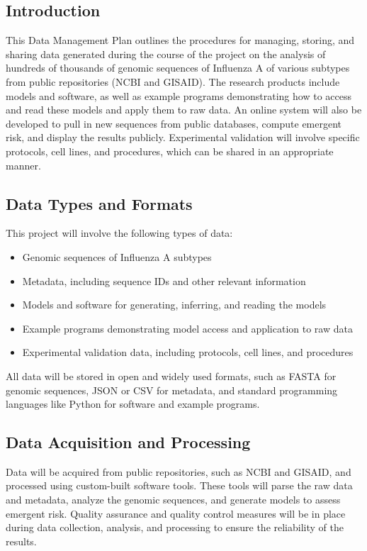 \documentclass[onecolumn, compsoc,12pt]{IEEEtran}
\begin{document}
\subsection{Introduction} 

This Data Management Plan outlines the procedures for managing, storing, and sharing data generated during the course of the project on the analysis of hundreds of thousands of genomic sequences of Influenza A of various subtypes from public repositories (NCBI and GISAID). The research products include models and software, as well as example programs demonstrating how to access and read these models and apply them to raw data. An online system will also be developed to pull in new sequences from public databases, compute emergent risk, and display the results publicly. Experimental validation will involve specific protocols, cell lines, and procedures, which can be shared in an appropriate manner.

\subsection{Data Types and Formats}

This project will involve the following types of data:

\begin{itemize}
  \item Genomic sequences of Influenza A subtypes
  \item Metadata, including sequence IDs and other relevant information
  \item Models and software for generating, inferring, and reading the models
  \item Example programs demonstrating model access and application to raw data
  \item Experimental validation data, including protocols, cell lines, and procedures
\end{itemize}

All data will be stored in open and widely used formats, such as FASTA for genomic sequences, JSON or CSV for metadata, and standard programming languages like Python for software and example programs.

\subsection{Data Acquisition and Processing}

Data will be acquired from public repositories, such as NCBI and GISAID, and processed using custom-built software tools. These tools will parse the raw data and metadata, analyze the genomic sequences, and generate models to assess emergent risk. Quality assurance and quality control measures will be in place during data collection, analysis, and processing to ensure the reliability of the results.
\end{document}
